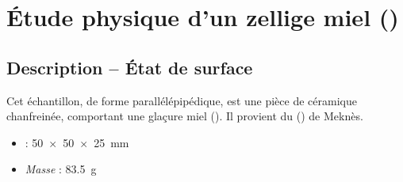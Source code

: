
\chapter{Étude physique d'un zellige miel ()}

\section{Description -- État de surface}

Cet échantillon, de forme parallélépipédique, est une pièce de 
céramique chanfreinée, comportant une glaçure miel 
(). Il provient du \PaM () de Meknès.

\begin{itemize}
  \item \DimText : \SI{50x50x25}{\mm}
  \item \emph{Masse} : \SI{83.5}{\g}
\end{itemize}


